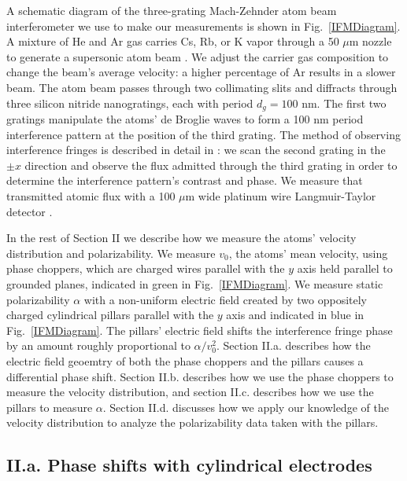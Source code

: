 \documentclass[twocolumn,pra,showpacs,superscriptaddress,longbibliography]{revtex4-1}   %
\newcommand{\figref}[1]{Fig.~\ref{#1}}
\begin{document}
A schematic diagram of the three-grating Mach-Zehnder atom beam interferometer we use to make our measurements is shown in \figref{IFMDiagram}. 
A mixture of He and Ar gas carries Cs, Rb, or K vapor through a 50 $\mu$m nozzle to generate a supersonic atom beam \cite{Scoles,Ekstrom1993}. We adjust the carrier gas composition to change the beam's average velocity: a higher percentage of Ar results in a slower beam.
The atom beam passes through two collimating slits and diffracts through three silicon nitride nanogratings, each with period $d_g = 100$ nm.
The first two gratings manipulate the atoms' de Broglie waves to form a 100 nm period interference pattern at the position of the third grating. 
The method of observing interference fringes is described in detail in \cite{Kokorowski2001}: we scan the second grating in the $\pm x$ direction and observe the flux admitted through the third grating in order to determine the interference pattern's contrast and phase.
We measure that transmitted atomic flux with a 100 $\mu$m wide platinum wire Langmuir-Taylor detector \cite{Delhuille2002}.

In the rest of Section II we describe how we measure the atoms' velocity distribution and polarizability.
We measure $v_0$, the atoms' mean velocity, using phase choppers, which are charged wires parallel with the $y$ axis held parallel to grounded planes, indicated in green in \figref{IFMDiagram}.
We measure static polarizability $\alpha$ with a non-uniform electric field created by two oppositely charged cylindrical pillars parallel with the $y$ axis and indicated in blue in \figref{IFMDiagram}. The pillars' electric field shifts the interference fringe phase by an amount roughly proportional to $\alpha/v_0^2$. 
Section II.a. describes how the electric field geoemtry of both the phase choppers and the pillars causes a differential phase shift. Section II.b. describes how we use the phase choppers to measure the velocity distribution, and section II.c. describes how we use the pillars to measure $\alpha$. Section II.d. discusses how we apply our knowledge of the velocity distribution to analyze the polarizability data taken with the pillars.


\subsection{II.a. Phase shifts with cylindrical electrodes}
\end{document}
